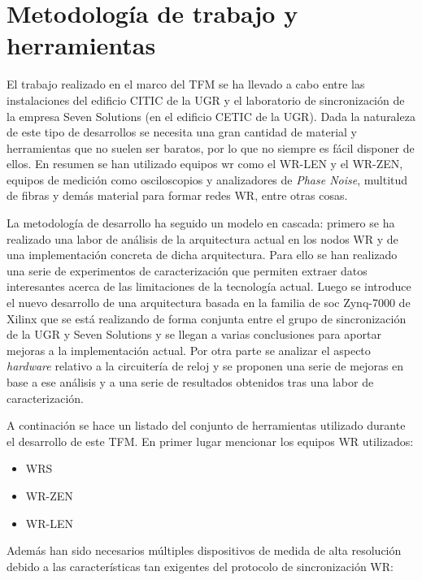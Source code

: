 \chapter{Metodología de trabajo y herramientas} \label{cap:herram}

El trabajo realizado en el marco del TFM se ha llevado a cabo entre las 
instalaciones del edificio CITIC de la UGR y el laboratorio de sincronización 
de la empresa Seven Solutions (en el edificio CETIC de la UGR). Dada la 
naturaleza de este tipo de desarrollos se necesita una gran cantidad de 
material y herramientas que no suelen ser baratos, por lo que no siempre es 
fácil disponer de ellos. En resumen se han utilizado equipos \gls{wr} como el 
WR-LEN y el WR-ZEN, equipos de medición como osciloscopios y analizadores de 
\textit{Phase Noise}, multitud de fibras y demás material para formar redes WR, 
entre otras cosas.

La metodología de desarrollo ha seguido un modelo en cascada: primero se ha 
realizado una labor de análisis de la arquitectura actual en los nodos WR y de 
una implementación concreta de dicha arquitectura. Para ello se han realizado 
una serie de experimentos de caracterización que permiten extraer datos 
interesantes acerca de las limitaciones de la tecnología actual. Luego se 
introduce el nuevo desarrollo de una arquitectura basada en la familia de 
\gls{soc} Zynq-7000 de Xilinx que se está realizando de forma conjunta entre el 
grupo de sincronización de la UGR y Seven Solutions y se llegan a varias 
conclusiones para aportar mejoras a la implementación actual. Por otra parte se 
analizar el aspecto \textit{hardware} relativo a la circuitería de reloj y se 
proponen una serie de mejoras en base a ese análisis y a una serie de 
resultados obtenidos tras una labor de caracterización. 

A continación se hace un listado del conjunto de herramientas utilizado durante 
el desarrollo de este TFM. En primer lugar mencionar los equipos WR utilizados:

\begin{itemize}
	\item WRS 
	\item WR-ZEN 
	\item WR-LEN 
\end{itemize}

Además han sido necesarios múltiples dispositivos de medida de alta resolución 
debido a las características tan exigentes del protocolo de sincronización WR:

